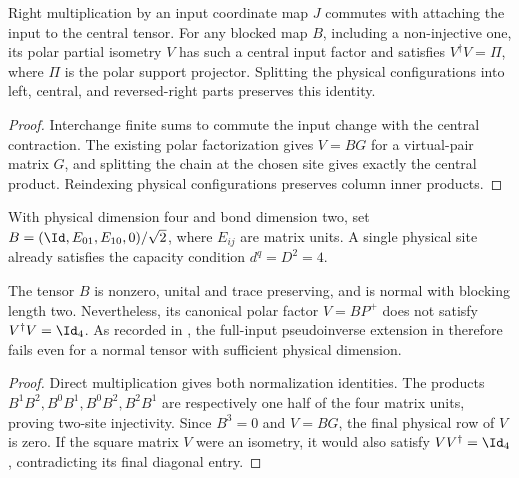 \begin{lemma}
    \label{thm:ldp_mixed_support_coordinates}
    \leanok
    Right multiplication by an input coordinate map $J$ commutes with
    attaching the input to the central tensor. For any blocked map $B$,
    including a non-injective one, its polar partial isometry $V$ has such
    a central input factor and satisfies $V^\dagger V=\Pi$, where $\Pi$
    is the polar support projector. Splitting the physical configurations
    into left, central, and reversed-right parts preserves this identity.
\end{lemma}
\begin{proof}
    \leanok
    Interchange finite sums to commute the input change with the central
    contraction. The existing polar factorization gives $V=BG$ for a
    virtual-pair matrix $G$, and splitting the chain at the chosen site
    gives exactly the central product. Reindexing physical configurations
    preserves column inner products.
\end{proof}

\begin{definition}
    \label{def:ldp_full_input_counterexample}
    \leanok
    With physical dimension four and bond dimension two, set
    $B=(\Id,E_{01},E_{10},0)/\sqrt2$, where $E_{ij}$ are matrix units.
    A single physical site already satisfies the capacity condition
    $d^q=D^2=4$.
\end{definition}
\begin{lemma}
    \label{thm:ldp_full_input_counterexample}
    \leanok
    The tensor $B$ is nonzero, unital and trace preserving, and is normal
    with blocking length two. Nevertheless, its canonical polar factor
    $V=BP^+$ does not satisfy $V^\dagger V=\Id_4$.
    As recorded in \cite{gap:mswc24_mixed_polar_injectivity_scope},
    the full-input pseudoinverse extension in
    \cite[footnote~3 to equations~(13)--(15)]{Malz2024Preparation} therefore
    fails even for a normal tensor with sufficient physical dimension.
\end{lemma}
\begin{proof}
    \leanok
    Direct multiplication gives both normalization identities. The products
    $B^1B^2,B^0B^1,B^0B^2,B^2B^1$ are respectively one half of the four
    matrix units, proving two-site injectivity. Since $B^3=0$ and $V=BG$,
    the final physical row of $V$ is zero. If the square matrix $V$ were
    an isometry, it would also satisfy $VV^\dagger=\Id_4$, contradicting
    its final diagonal entry.
\end{proof}

